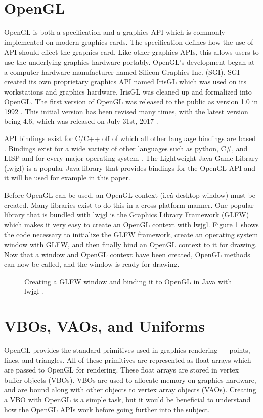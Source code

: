 \documentclass{article}
\begin{document}
\section{OpenGL}
OpenGL is both a specification and a graphics API which is commonly implemented on modern graphics cards. The specification defines how the use of API should effect the graphics card. Like other graphics APIs, this allows users to use the underlying graphics hardware portably. OpenGL's development began at a computer hardware manufacturer named Silicon Graphics Inc. (SGI). SGI created its own proprietary graphics API named IrisGL which was used on its workstations and graphics hardware. IrisGL was cleaned up and formalized into OpenGL. The first version of OpenGL was released to the public as version 1.0 in 1992 \cite{openglwiki2018}. This initial version has been revised many times, with the latest version being 4.6, which was released on July 31st, 2017 \cite{openglwiki2018}.

API bindings exist for C/C++ off of which all other language bindings are based \cite{openglwiki2018}. Bindings exist for a wide variety of other languages such as python, C\#, and LISP and for every major operating system \cite{openglwiki2018}. The Lightweight Java Game Library (lwjgl) is a popular Java library that provides bindings for the OpenGL API and it will be used for example in this paper.

Before OpenGL can be used, an OpenGL context (i.e\. a desktop window) must be created. Many libraries exist to do this in a cross-platform manner. One popular library that is bundled with lwjgl is the Graphics Library Framework (GLFW) which makes it very easy to create an OpenGL context with lwjgl. Figure \ref{fig:glfw-creation} shows the code necessary to initialize the GLFW framework, create an operating system window with GLFW, and then finally bind an OpenGL context to it for drawing. Now that a window and OpenGL context have been created, OpenGL methods can now be called, and the window is ready for drawing.

\begin{figure}[h]
	
	\caption{Creating a GLFW window and binding it to OpenGL in Java with lwjgl \cite{lwjgl}.}
	\label{fig:glfw-creation}
\end{figure}

\section{VBOs, VAOs, and Uniforms}
OpenGL provides the standard primitives used in graphics rendering --- points, lines, and triangles. All of these primitives are represented as float arrays which are passed to OpenGL for rendering. These float arrays are stored in vertex buffer objects (VBOs). VBOs are used to allocate memory on graphics hardware, and are bound along with other objects to vertex array objects (VAOs). Creating a VBO with OpenGL is a simple task, but it would be beneficial to understand how the OpenGL APIs work before going further into the subject.
\end{document}
